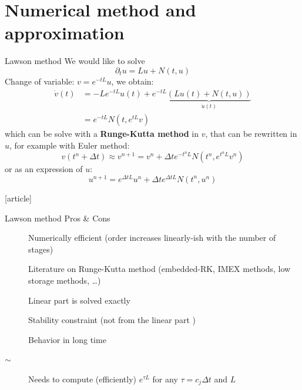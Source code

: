\documentclass{beamer}
\newcommand{\cmark}{{\color{dgreen}\ding{52}}}
\newcommand{\xmark}{{\color{red}\ding{55}}}
\newcommand{\bmark}{{\color{orange}$\sim$}}
\newcommand{\mbold}[1]{{\textbf{\color{PLB}#1}}}
\newcommand{\customcite}[1]{\cite{#1}}
\begin{document}
\section{Numerical method and approximation}

\begin{frame}{Lawson method}
  We would like to solve
  $$
    \partial_t u = Lu + N(t,u)
  $$
  Change of variable: \mbold{$v = e^{-tL}u$}, we obtain:
  $$
    \begin{aligned}
      \dot{v}(t) &= -Le^{-tL}u(t) + e^{-tL}\underbrace{\left(Lu(t) + N(t,u)\right)}_{\dot{u}(t)} \\
                 &= e^{-tL}N(t,e^{tL}v)
    \end{aligned}
  $$
  which can be solve with a \mbold{Runge-Kutta method} in $v$, that can be rewritten in $u$, for example with Euler method:
  $$
    v(t^n+\Delta t) \approx v^{n+1} = v^n + \Delta t e^{-t^nL}N(t^n,e^{t^nL}v^n)
  $$
  or as an expression of $u$:
  $$
    u^{n+1} = e^{\Delta t L}u^n + \Delta te^{\Delta t L}N(t^n,u^n)
  $$
  \begin{thebibliography}{9}
    [article]
     \customcite{Lawson:1967a}
     \customcite{Hochbruck:2020}
  \end{thebibliography}
\end{frame}
\begin{frame}{Lawson method}
  {Pros \& Cons}
  \begin{description}
    \item[\cmark] Numerically efficient (order increases linearly-ish with the number of stages)
    \item[\cmark] Literature on Runge-Kutta method (embedded-RK, IMEX methods, low storage methods, \dots)
    \item[\cmark] Linear part is solved exactly
    \item[\xmark] Stability constraint (not from the linear part \cmark)
    \item[\xmark] Behavior in long time
    \item[\bmark] Needs to compute (efficiently) $e^{\tau L}$ for any $\tau=c_j\Delta t$ and $L$
  \end{description}
\end{frame}
\end{document}
